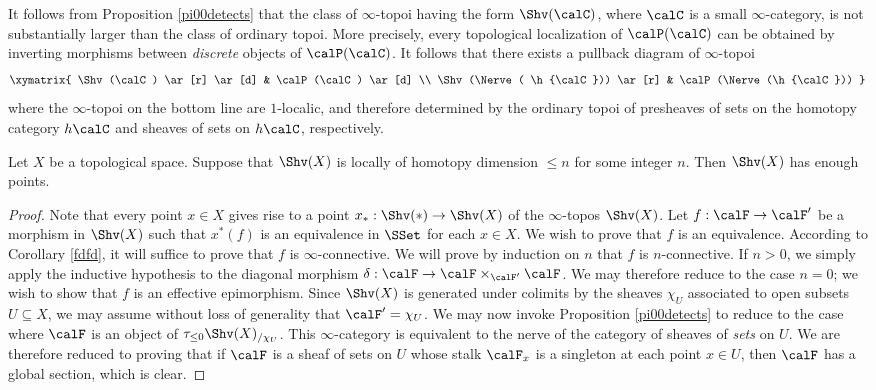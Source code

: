 \begin{remark}\label{charnice}
It follows from Proposition \ref{pi00detects} that the class of $\infty$-topoi having the form
$\Shv(\calC)$, where $\calC$ is a small $\infty$-category, is not substantially larger than the class of ordinary topoi. More precisely, every topological localization of $\calP(\calC)$ can be obtained by inverting
morphisms between {\em discrete} objects of $\calP(\calC)$. It follows that there exists a pullback diagram of $\infty$-topoi
$$ \xymatrix{ \Shv(\calC) \ar[r] \ar[d] & \calP(\calC) \ar[d] \\
\Shv(\Nerve( \h{\calC})) \ar[r] & \calP(\Nerve(\h{\calC})) }$$
where the $\infty$-topoi on the bottom line are $1$-localic, and therefore determined by the
ordinary topoi of presheaves of sets on the homotopy category $h\calC$ and sheaves of sets on $h\calC$, respectively.
\end{remark}

\begin{corollary}\label{enuff}
Let $X$ be a topological space. Suppose that $\Shv(X)$ is locally of homotopy dimension $\leq n$ for some integer $n$. Then $\Shv(X)$ has enough points.
\end{corollary}

\begin{proof}
Note that every point $x \in X$ gives rise to a point $x_{\ast}: \Shv(\ast) \rightarrow \Shv(X)$
of the $\infty$-topos $\Shv(X)$. Let $f: \calF \rightarrow \calF'$ be a morphism in
$\Shv(X)$ such that $x^{\ast}(f)$ is an equivalence in $\SSet$ for each $x \in X$. We wish to prove that $f$ is an equivalence. According to Corollary \ref{fdfd}, it will suffice to prove that $f$ is $\infty$-connective. We will prove by induction on $n$ that $f$ is $n$-connective. If
$n > 0$, we simply apply the inductive hypothesis to the diagonal morphism
$\delta: \calF \rightarrow \calF \times_{\calF'} \calF$. We may therefore reduce to the case
$n=0$; we wish to show that $f$ is an effective epimorphism. Since $\Shv(X)$ is generated under colimits by the sheaves $\chi_U$ associated to open subsets $U \subseteq X$,  we may assume without loss of generality that $\calF' = \chi_{U}$. We may now invoke Proposition \ref{pi00detects} to reduce to the case where $\calF$ is an object of $\tau_{\leq 0} \Shv(X)_{/\chi_U}$. This $\infty$-category is equivalent to the nerve of the category of sheaves of {\em sets} on $U$. We are therefore reduced to proving that if $\calF$ is a sheaf of sets on $U$ whose stalk
$\calF_{x}$ is a singleton at each point $x \in U$, then $\calF$ has a global section, which is clear.
\end{proof}

